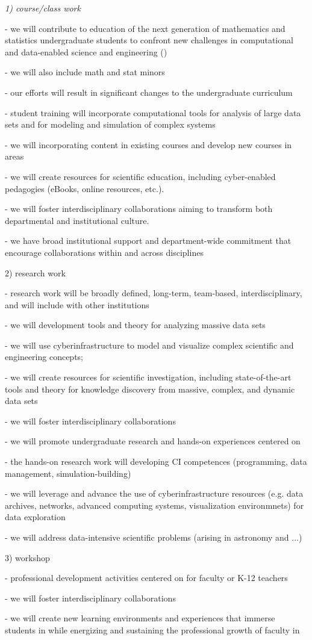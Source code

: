 {\it 
1) course/class work 

- we will contribute to education of the next generation of mathematics and statistics 
   undergraduate students to confront new challenges in computational and data-enabled 
   science and engineering (\cdse) 

- we will also include math and stat minors 

- our efforts will result in significant changes to the undergraduate curriculum

- student training will incorporate computational tools for analysis of large data sets and
   for modeling and simulation of complex systems

- we will incorporating \cdse content in existing courses and develop new courses in 
   \cdse areas

- we will create resources for scientific education, including cyber-enabled pedagogies 
   (eBooks, online resources, etc.).

- we will foster interdisciplinary collaborations aiming to transform both departmental and 
   institutional culture.

- we have broad institutional support and department-wide commitment that encourage 
   collaborations within and across disciplines


2) research work

- research work will be broadly defined, long-term, team-based, interdisciplinary, and 
   will include with other institutions 

- we will development tools and theory for analyzing massive data sets

- we will use cyberinfrastructure to model and visualize complex scientific and engineering 
   concepts;

- we will create resources for scientific investigation, including state-of-the-art tools and 
  theory for knowledge discovery from massive, complex, and dynamic data sets

- we will foster interdisciplinary collaborations

- we will promote undergraduate research and hands-on experiences centered on \cdse

- the hands-on research work will developing CI competences (programming, data 
   management, simulation-building)

- we will leverage and advance the use of cyberinfrastructure resources (e.g. data archives, 
   networks, advanced computing systems, visualization environmnets) for data exploration

- we will address data-intensive scientific problems (arising in astronomy and ...)

3) workshop

- professional development activities centered on \cdse for faculty or K-12 teachers

- we will foster interdisciplinary collaborations

- we will create new learning environments and experiences that immerse students in \cdse 
   while energizing and sustaining the professional growth of faculty in \cdse
}



